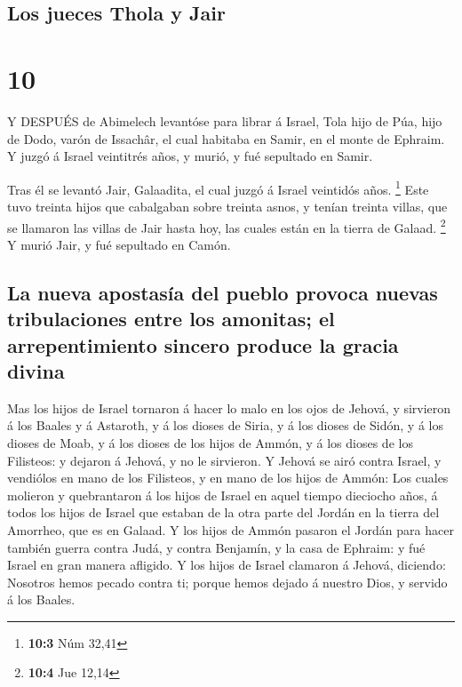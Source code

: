 \hypertarget{los-jueces-thola-y-jair}{%
\subsection{Los jueces Thola y Jair}\label{los-jueces-thola-y-jair}}

\hypertarget{section-9}{%
\section{10}\label{section-9}}

 Y DESPUÉS de Abimelech levantóse para librar á Israel, Tola
hijo de Púa, hijo de Dodo, varón de Issachâr, el cual habitaba en Samir,
en el monte de Ephraim.  Y juzgó á Israel veintitrés años, y
murió, y fué sepultado en Samir.

 Tras él se levantó Jair, Galaadita, el cual juzgó á Israel
veintidós años. \footnote{\textbf{10:3} Núm 32,41}  Este
tuvo treinta hijos que cabalgaban sobre treinta asnos, y tenían treinta
villas, que se llamaron las villas de Jair hasta hoy, las cuales están
en la tierra de Galaad. \footnote{\textbf{10:4} Jue 12,14} 
Y murió Jair, y fué sepultado en Camón.

\hypertarget{la-nueva-apostasuxeda-del-pueblo-provoca-nuevas-tribulaciones-entre-los-amonitas-el-arrepentimiento-sincero-produce-la-gracia-divina}{%
\subsection{La nueva apostasía del pueblo provoca nuevas tribulaciones
entre los amonitas; el arrepentimiento sincero produce la gracia
divina}\label{la-nueva-apostasuxeda-del-pueblo-provoca-nuevas-tribulaciones-entre-los-amonitas-el-arrepentimiento-sincero-produce-la-gracia-divina}}

 Mas los hijos de Israel tornaron á hacer lo malo en los
ojos de Jehová, y sirvieron á los Baales y á Astaroth, y á los dioses de
Siria, y á los dioses de Sidón, y á los dioses de Moab, y á los dioses
de los hijos de Ammón, y á los dioses de los Filisteos: y dejaron á
Jehová, y no le sirvieron.  Y Jehová se airó contra Israel,
y vendiólos en mano de los Filisteos, y en mano de los hijos de Ammón:
 Los cuales molieron y quebrantaron á los hijos de Israel en
aquel tiempo dieciocho años, á todos los hijos de Israel que estaban de
la otra parte del Jordán en la tierra del Amorrheo, que es en Galaad.
 Y los hijos de Ammón pasaron el Jordán para hacer también
guerra contra Judá, y contra Benjamín, y la casa de Ephraim: y fué
Israel en gran manera afligido.  Y los hijos de Israel
clamaron á Jehová, diciendo: Nosotros hemos pecado contra ti; porque
hemos dejado á nuestro Dios, y servido á los Baales.

